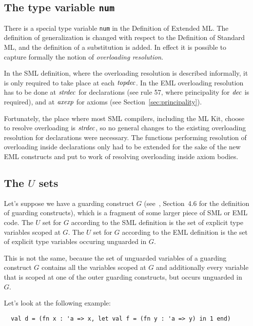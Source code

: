 \subsection{The type variable {\tt num}}
\label{sec:num}

There is a special type variable {\tt num} in the Definition of Extended ML.
The definition of generalization is changed with respect
to the Definition of Standard ML, 
and the definition of a substitution is added.
In effect it is possible to capture formally the notion of \emph{overloading resolution}.

In the SML definition, where the overloading resolution is described
informally, it is only required to take place at each ${\it topdec}$.
In the EML overloading resolution has to be done at ${\it strdec}$
for declarations (see rule 57, where principality for ${\it dec}$ is required),
and at ${\it axexp}$ for axioms (see Section~\ref{sec:principality}).

Fortunately, the place where most SML compilers, including the ML Kit, 
choose to resolve overloading is ${\it strdec}$, so no general changes 
to the existing overloading resolution for declarations were necessary.
The functions performing resolution of overloading inside declarations 
only had to be extended for the sake of the new EML constructs 
and put to work of resolving overloading inside axiom bodies.

\subsection{The $U$ sets}
\label{sec:u_sets}

Let's suppose we have a guarding construct $G$ 
(see~\cite{bib:KST94}, Section~4.6 for the definition of guarding constructs),
which is a fragment of some larger piece of SML or EML code.
The $U$ set for $G$ according to the SML definition  
is the set of explicit type variables scoped at $G$.
The $U$ set for $G$ according to the EML definition
is the set of explicit type variables occuring unguarded in $G$.

This is not the same, because the set of unguarded variables 
of a guarding construct $G$ contains all the variables scoped at $G$
and additionally every variable that is scoped at one of the outer guarding 
constructs, but occurs unguarded in $G$.

Let's look at the following example:

\begin{verbatim}
  val d = (fn x : 'a => x, let val f = (fn y : 'a => y) in 1 end)
\end{verbatim}

